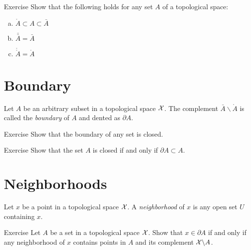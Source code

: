 \begin{thm}{Exercise}
Show that the following holds for any set $A$ of a topological space:
\begin{enumerate}[(a)]
\item $\mathring A\subset A\subset \bar A$
\item $\bar{\bar A}=\bar A$ 
\item $\mathring{\mathring A}=\mathring A$
\end{enumerate}
\end{thm}

\section{Boundary}

Let $A$ be an arbitrary subset in a topological space $\mathcal{X}$.
The complement $\bar A\backslash \mathring A$ is called the \emph{boundary} of $A$ and dented as $\partial A$.

\begin{thm}{Exercise}
Show that the boundary of any set is closed.
\end{thm}

\begin{thm}{Exercise}
Show that the set $A$ is closed if and only if $\partial A\subset A$.
\end{thm}

\section{Neighborhoods}

Let $x$ be a point in a topological space $\mathcal{X}$.
A \emph{neighborhood} of $x$ is any open set $U$ containing $x$.


\begin{thm}{Exercise}
Let $A$ be a set in a topological space $\mathcal{X}$.
Show that $x\in \partial A$ if and only if any neighborhood of $x$ contains points in $A$ and its complement $\mathcal{X}\backslash A$. 
\end{thm}


 
